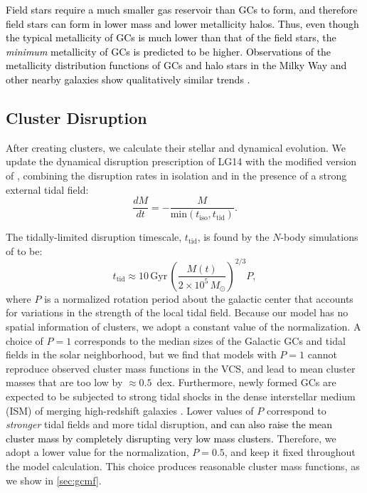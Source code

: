 \documentclass[fleqn,usenatbib]{mnras}
\newcommand{\rev}[1]{\textcolor{black}{#1}}
\newcommand{\Msun}{\,M_{\odot}}
\newcommand{\ttid}{t_{\mathrm{tid}}}
\newcommand{\tiso}{t_{\mathrm{iso}}}
\begin{document}
\rev{Field stars require a much smaller gas reservoir than GCs to form, and therefore field stars can form in lower mass and lower metallicity halos. Thus, even though the typical metallicity of GCs is much lower than that of the field stars, the \textit{minimum} metallicity of GCs is predicted to be higher. Observations of the metallicity distribution functions of GCs and halo stars in the Milky Way and other nearby galaxies show qualitatively similar trends \citep[e.g.,][]{lamers_etal_2017}.}

\subsection{Cluster Disruption}
\label{sec:disruption}

After creating clusters, we calculate their stellar and dynamical evolution. We update the dynamical disruption prescription of LG14 with the modified version of \citet{gnedin_etal14}, combining the disruption rates in isolation and in the presence of a strong external tidal field:
\begin{equation}
  \frac{dM}{dt} = -\frac{M}{\mathrm{min}\left(\tiso, \ttid\right)}.
  \label{eqn:dmdt}
\end{equation}

The tidally-limited disruption timescale, $\ttid$, is found by the $N$-body simulations of \citet{gieles_baumgardt08} to be:
\begin{equation}
  \ttid \approx 10\,\mathrm{Gyr}\, \left(\frac{M(t)}{2 \times 10^{5}\Msun}\right)^{2/3} P,
  \label{eqn:ttid}
\end{equation}
where $P$ is a normalized rotation period about the galactic center that accounts for variations in the strength of the local tidal field. Because our model has no spatial information of clusters, we adopt a constant value of the normalization. A choice of $P=1$ corresponds to the median sizes of the Galactic GCs and tidal fields in the solar neighborhood, but we find that models with $P=1$ cannot reproduce observed cluster mass functions in the VCS, and lead to mean cluster masses that are too low by $\approx 0.5$~dex. Furthermore, newly formed GCs are expected to be subjected to strong tidal shocks in the dense interstellar medium (ISM) of merging high-redshift galaxies \citep[e.g.,][]{kruijssen12, kim_etal_2018}. Lower values of $P$ correspond to \textit{stronger} tidal fields and more tidal disruption\rev{, and can also raise the mean cluster mass by completely disrupting very low mass clusters.} Therefore, we adopt a lower value for the normalization, $P=0.5$, and keep it fixed throughout the model calculation. This choice produces reasonable cluster mass functions, as we show in \autoref{sec:gcmf}.
\end{document}
